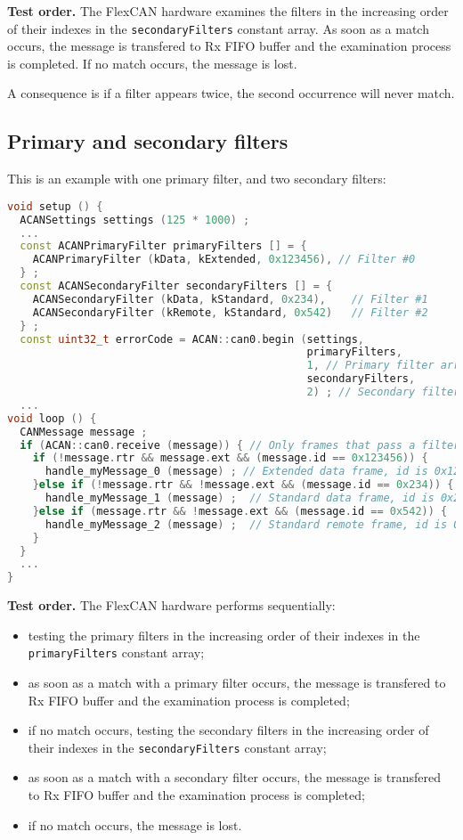 \documentclass[10pt, a4paper, obeyspaces, openany]{extarticle}
\begin{document}
{\bf Test order.} The FlexCAN hardware examines the filters in the increasing order of their indexes in the \texttt{secondaryFilters} constant array. As soon as a match occurs, the message is transfered to Rx FIFO buffer and the examination process is completed. If no match occurs, the message is lost.

A consequence is if a filter appears twice, the second occurrence will never match.



\subsection{Primary and secondary filters}

This is an example with one primary filter, and two secondary filters:
{ \small\begin{lstlisting}[language=c++]
void setup () {
  ACANSettings settings (125 * 1000) ;
  ...
  const ACANPrimaryFilter primaryFilters [] = {
    ACANPrimaryFilter (kData, kExtended, 0x123456), // Filter #0
  } ;
  const ACANSecondaryFilter secondaryFilters [] = {
    ACANSecondaryFilter (kData, kStandard, 0x234),    // Filter #1
    ACANSecondaryFilter (kRemote, kStandard, 0x542)   // Filter #2
  } ;
  const uint32_t errorCode = ACAN::can0.begin (settings,
                                               primaryFilters, 
                                               1, // Primary filter array size
                                               secondaryFilters,
                                               2) ; // Secondary filter array size
  ...
void loop () {
  CANMessage message ;
  if (ACAN::can0.receive (message)) { // Only frames that pass a filter are retrieved
    if (!message.rtr && message.ext && (message.id == 0x123456)) {
      handle_myMessage_0 (message) ; // Extended data frame, id is 0x123456
    }else if (!message.rtr && !message.ext && (message.id == 0x234)) {
      handle_myMessage_1 (message) ;  // Standard data frame, id is 0x234
    }else if (message.rtr && !message.ext && (message.id == 0x542)) {
      handle_myMessage_2 (message) ;  // Standard remote frame, id is 0x542
    }
  }
  ...
}
\end{lstlisting}}


{\bf Test order.} The FlexCAN hardware performs sequentially:
\begin{itemize}
  \item testing the primary filters in the increasing order of their indexes in the \texttt{primaryFilters} constant array;
  \item as soon as a match with a primary filter occurs, the message is transfered to Rx FIFO buffer and the examination process is completed;
  \item if no match occurs, testing the secondary filters in the increasing order of their indexes in the \texttt{secondaryFilters} constant array;
  \item as soon as a match with a secondary filter occurs, the message is transfered to Rx FIFO buffer and the examination process is completed;
  \item if no match occurs, the message is lost.
\end{itemize}
\end{document}
